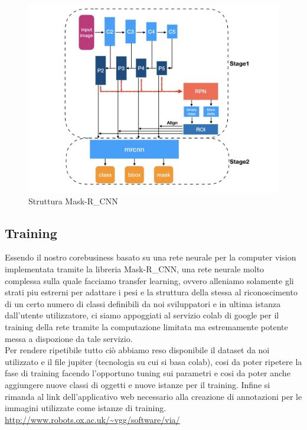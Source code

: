 \documentclass[12pt,a4paper]{article}
\newcommand{\mrcnn}{Mask-R\_CNN}
\begin{document}
\begin{figure}[H]
    \caption{Struttura \mrcnn}
    \centering
    \includegraphics[width=\textwidth,height=\textheight,keepaspectratio]{mask_description.jpeg}
\end{figure}

\subsection{Training}

Essendo il nostro corebusiness basato su una rete neurale per la
computer vision implementata tramite la libreria \mrcnn, una rete
neurale molto complessa sulla quale facciamo transfer learning, ovvero
alleniamo solamente gli strati piu estrerni per adattare i pesi e la
struttura della stessa al riconoscimento di un certo numero di classi
definibili da noi sviluppatori e in ultima istanza dall'utente
utilizzatore, ci siamo appoggiati al servizio colab di google per il
training della rete tramite la computazione limitata ma estremamente
potente messa a dispozione da tale servizio.\\
Per rendere ripetibile tutto ciò abbiamo reso disponibile il dataset da
noi utilizzato e il file jupiter (tecnologia su cui si basa colab), cosi
da poter ripetere la fase di training facendo l'opportuno tuning sui
parametri e cosi da poter anche aggiungere nuove classi di oggetti e
nuove istanze per il training. Infine si rimanda al link
dell'applicativo web necessario alla creazione di annotazioni per le
immagini utilizzate come istanze di training.
\url{http://www.robots.ox.ac.uk/~vgg/software/via/}
\end{document}
